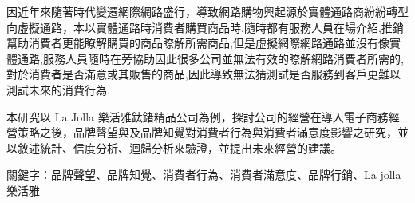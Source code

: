 因近年來隨著時代變遷網際網路盛行，導致網路購物興起源於實體通路商紛紛轉型向虛擬通路，本以實體通路時消費者購買商品時,隨時都有服務人員在場介紹,推銷幫助消費者更能瞭解購買的商品瞭解所需商品,但是虛擬網際網路通路並沒有像實體通路,服務人員隨時在旁協助因此很多公司並無法有效的瞭解網路消費者所需的,對於消費者是否滿意或其販售的商品,因此導致無法猜測試是否服務到客戶更難以測試未來的消費行為.

本研究以 La Jolla 樂活雅鈦鍺精品公司為例，探討公司的經營在導入電子商務經營策略之後，品牌聲望與及品牌知覺對消費者行為與消費者滿意度影響之研究，並以敘述統計、信度分析、迴歸分析來驗證，並提出未來經營的建議。
 





關鍵字：品牌聲望、品牌知覺、消費者行為、消費者滿意度、品牌行銷、La jolla樂活雅
